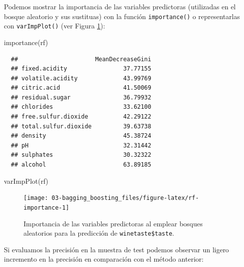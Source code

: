 \documentclass[
]{book}
\newenvironment{Shaded}{\begin{snugshade}}{\end{snugshade}}
\newcommand{\AttributeTok}[1]{\textcolor[rgb]{0.77,0.63,0.00}{#1}}
\newcommand{\FunctionTok}[1]{\textcolor[rgb]{0.00,0.00,0.00}{#1}}
\newcommand{\NormalTok}[1]{#1}
\newcommand{\OtherTok}[1]{\textcolor[rgb]{0.56,0.35,0.01}{#1}}
\newcommand{\SpecialCharTok}[1]{\textcolor[rgb]{0.00,0.00,0.00}{#1}}
\theoremstyle{break}
\theoremstyle{nonumberplain}
\begin{document}
Podemos mostrar la importancia de las variables predictoras (utilizadas en el bosque aleatorio y sus sustituas) con la función \texttt{importance()} o representarlas con \texttt{varImpPlot()} (ver Figura \ref{fig:rf-importance}):



\begin{Shaded}
\begin{Highlighting}[]
\FunctionTok{importance}\NormalTok{(rf)}
\end{Highlighting}
\end{Shaded}

\begin{verbatim}
  ##                      MeanDecreaseGini
  ## fixed.acidity                37.77155
  ## volatile.acidity             43.99769
  ## citric.acid                  41.50069
  ## residual.sugar               36.79932
  ## chlorides                    33.62100
  ## free.sulfur.dioxide          42.29122
  ## total.sulfur.dioxide         39.63738
  ## density                      45.38724
  ## pH                           32.31442
  ## sulphates                    30.32322
  ## alcohol                      63.89185
\end{verbatim}

\begin{Shaded}
\begin{Highlighting}[]
\FunctionTok{varImpPlot}\NormalTok{(rf)}
\end{Highlighting}
\end{Shaded}

\begin{figure}[!htb]

{\centering \texttt{[image: 03-bagging\_boosting\_files/figure-latex/rf-importance-1]} 

}

\caption{Importancia de las variables predictoras al emplear bosques aleatorios para la predicción de \texttt{winetaste\$taste}.}\label{fig:rf-importance}
\end{figure}

Si evaluamos la precisión en la muestra de test podemos observar un ligero incremento en la precisión en comparación con el método anterior:

\begin{Shaded}
\end{Shaded}
\end{document}
